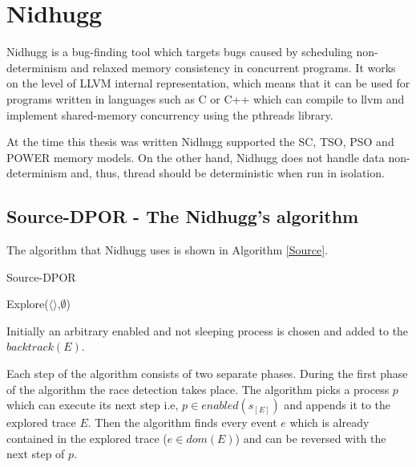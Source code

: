 \chapter{Nidhugg}
\label{Chapter 3}

Nidhugg is a bug-finding tool which targets bugs caused by scheduling non-determinism
and relaxed memory consistency in concurrent programs. It works on the
level of LLVM internal representation, which means that it can be used
for programs written in languages such as C or C++ which can compile to llvm and implement shared-memory concurrency using the pthreads
library.

At the time this thesis was written Nidhugg supported the SC, TSO, PSO and POWER memory
models. On the other hand, Nidhugg does not handle data non-determinism and, thus,
thread should be deterministic when run in isolation.

\section{Source-DPOR - The Nidhugg's algorithm}

The algorithm that Nidhugg uses is shown in Algorithm \ref{Source}.

\begin{algorithm}
    \caption{Source-DPOR}
    \label{Source}
    Explore($\langle \rangle$,$\emptyset$)\;
\end{algorithm}

\noindent Initially an arbitrary enabled and not sleeping
process is chosen and added to the $backtrack(E)$. 

Each step of the algorithm consists of two separate phases. 
During the first phase of the algorithm the race detection takes place.
The algorithm picks a process $p$ which can execute its next step i.e, $p \in enabled(s_{[E]})$ and appends it to the explored trace $E$.
Then the algorithm finds every event $e$ which is already contained in the explored trace ($e \in dom(E)$) and can be reversed with the next step of $p$.

